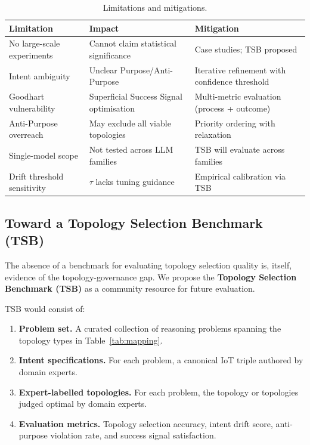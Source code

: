 \documentclass[11pt,a4paper]{article}
\begin{document}
\begin{table}[htbp]
\centering
\caption{Limitations and mitigations.}
\label{tab:limitations}
\small
\begin{tabularx}{\textwidth}{@{}lXX@{}}
\toprule
\textbf{Limitation} & \textbf{Impact} & \textbf{Mitigation} \\
\midrule
No large-scale experiments & Cannot claim statistical significance & Case studies; TSB proposed \\
Intent ambiguity & Unclear Purpose/Anti-Purpose & Iterative refinement with confidence threshold \\
Goodhart vulnerability & Superficial Success Signal optimisation & Multi-metric evaluation (process + outcome) \\
Anti-Purpose overreach & May exclude all viable topologies & Priority ordering with relaxation \\
Single-model scope & Not tested across LLM families & TSB will evaluate across families \\
Drift threshold sensitivity & $\tau$ lacks tuning guidance & Empirical calibration via TSB \\
\bottomrule
\end{tabularx}
\end{table}

\subsection{Toward a Topology Selection Benchmark (TSB)}

The absence of a benchmark for evaluating topology selection quality is, itself, evidence of the topology-governance gap. We propose the \textbf{Topology Selection Benchmark (TSB)} as a community resource for future evaluation.

TSB would consist of:
\begin{enumerate}
  \item \textbf{Problem set.} A curated collection of reasoning problems spanning the topology types in Table~\ref{tab:mapping}.
  \item \textbf{Intent specifications.} For each problem, a canonical IoT triple authored by domain experts.
  \item \textbf{Expert-labelled topologies.} For each problem, the topology or topologies judged optimal by domain experts.
  \item \textbf{Evaluation metrics.} Topology selection accuracy, intent drift score, anti-purpose violation rate, and success signal satisfaction.
\end{enumerate}
\end{document}
